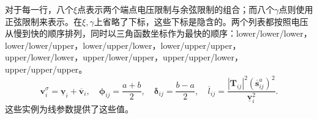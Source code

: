 \documentclass{article}
\begin{document}
对于每一行，八个$\xi$点表示两个端点电压限制与余弦限制的组合；而八个$\gamma$点则使用正弦限制来表示。在$\xi,\gamma$上省略了下标，这些下标是隐含的。两个列表都按照电压从慢到快的顺序排列，同时以三角函数坐标作为最快的顺序：lower/lower/lower，lower/lower/upper，lower/upper/lower，lower/upper/upper，upper/lower/lower，upper/lower/upper，upper/upper/lower，upper/upper/upper。
\[
 \boldsymbol v_i^\sigma=\underline{\boldsymbol v}_i+\overline{\boldsymbol v}_i,
 \quad\boldsymbol\phi_{ij}=\frac{a+b}{2},
 \quad\boldsymbol\delta_{ij}=\frac{b-a}{2},
 \quad\overline l_{ij}=\frac{|\boldsymbol T_{ij}|^2(\overline{\boldsymbol s}_{ij}^a)^2}
 {\underline{\boldsymbol v}_i^2}.
\]
这些实例为线参数提供了这些值。
\end{document}
